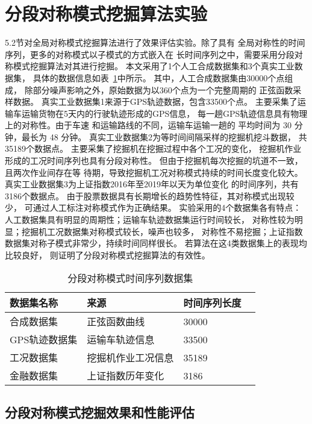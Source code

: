 \section{分段对称模式挖掘算法实验}

5.2节对全局对称模式挖掘算法进行了效果评估实验。除了具有
全局对称性的时间序列，更多的对称模式以子模式的方式嵌入在
长时间序列之中，需要采用分段对称模式挖掘算法对其进行挖掘。
本文采用了1个人工合成数据集和3个真实工业数据集，
具体的数据信息如表~\ref{tab:segment_dataset}中所示。
其中，人工合成数据集由30000个点组成，
除部分噪声影响之外，原始数据为以360个点为一个完整周期的
正弦函数采样数据。
真实工业数据集1来源于GPS轨迹数据，包含33500个点。
主要采集了运输车运输货物在5天内的行驶轨迹形成的GPS信息，
每一趟GPS轨迹信息具有物理上的对称性。由于车速
和运输路线的不同，运输车运输一趟的
平均时间为 30 分钟，最长为 48 分钟。
真实工业数据集2为等时间间隔采样的挖掘机挖斗数据，
共35189个数据点。
主要采集了挖掘机在挖掘过程中各个工况的变化，
挖掘机作业形成的工况时间序列也具有分段对称性。
但由于挖掘机每次挖掘的坑道不一致，且两次作业间存在等
待期，导致挖掘机工况对称模式持续的时间长度变化较大。
真实工业数据集3为上证指数2016年至2019年以天为单位变化
的时间序列，共有3186个数据点。
由于股票数据具有长期增长的趋势性特征，其对称模式出现较少，
可通过人工标注对称模式作为正确结果。
实验采用的4个数据集各有特点：
人工数据集具有明显的周期性；运输车轨迹数据集运行时间较长，
对称性较为明显；挖掘机工况数据集对称模式较长，噪声也较多，
对称性不易挖掘；上证指数数据集对称子模式非常少，持续时间同样很长。
若算法在这4类数据集上的表现均比较良好，
则证明了分段对称模式挖掘算法的有效性。

\begin{table}
  \centering
  \caption{分段对称模式时间序列数据集}
  \begin{tabular}{llll}
    \toprule
    数据集名称       & 来源                   & 时间序列长度  \\
    \midrule
    合成数据集       & 正弦函数曲线           & 30000               \\
    GPS轨迹数据集 & 运输车轨迹信息       & 33500              \\
    工况数据集 & 挖掘机作业工况信息 & 35189              \\
    金融数据集       & 上证指数历年变化       & 3186               \\
    \bottomrule
  \end{tabular}
  \label{tab:segment_dataset}
\end{table}

\subsection{分段对称模式挖掘效果和性能评估}

